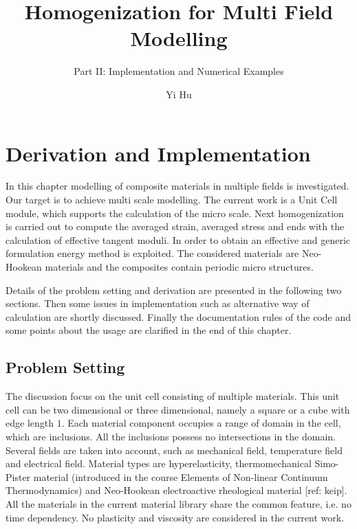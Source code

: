\documentclass[10pt,a4paper]{scrreprt}
\author{Yi Hu}
\title{Homogenization for Multi Field Modelling}
\subtitle{Part II: Implementation and Numerical Examples}
\begin{document}
\chapter{Derivation and Implementation}
In this chapter modelling of composite materials in multiple fields is investigated. Our target is to achieve multi scale modelling. The current work is a Unit Cell module, which supports the calculation of the micro scale. Next homogenization is carried out to compute the averaged strain, averaged stress and ends with the calculation of effective tangent moduli. In order to obtain an effective and generic formulation energy method is exploited. The considered materials are Neo-Hookean materials and the composites contain periodic micro structures.

Details of the problem setting and derivation are presented in the following two sections. Then some issues in implementation such as alternative way of calculation are shortly discussed. Finally the documentation rules of the code and some points about the usage are clarified in the end of this chapter.

\section{Problem Setting}
The discussion focus on the unit cell consisting of multiple materials. This unit cell can be two dimensional or three dimensional, namely a square or a cube with edge length $1$. Each material component occupies a range of domain in the cell, which are inclusions. All the inclusions possess no intersections in the domain. Several fields are taken into account, such as mechanical field, temperature field and electrical field. Material types are hyperelasticity, thermomechanical Simo-Pister material (introduced in the course Elements of Non-linear Continuum Thermodynamics) and Neo-Hookean electroactive rheological material [ref: keip]. All the materials in the current material library share the common feature, i.e. no time dependency. No plasticity and viscosity are considered in the current work.
\end{document}

